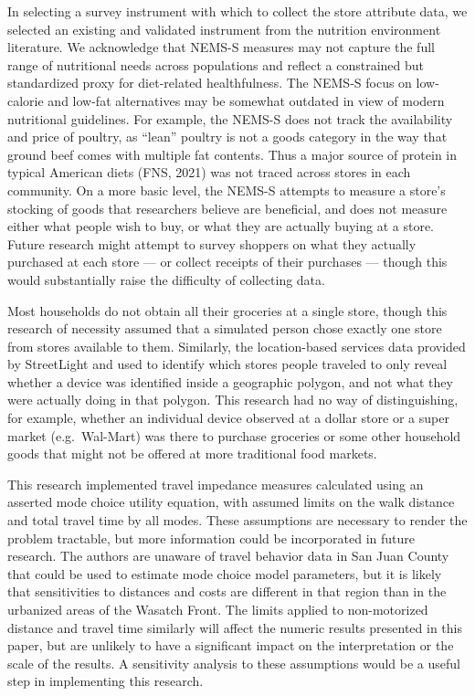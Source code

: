 \documentclass[
  letterpaper,
  number,
  review,
  3p]{elsarticle}
\begin{document}
In selecting a survey instrument with which to collect the store
attribute data, we selected an existing and validated instrument from
the nutrition environment literature. We acknowledge that NEMS-S
measures may not capture the full range of nutritional needs across
populations and reflect a constrained but standardized proxy for
diet-related healthfulness. The NEMS-S focus on low-calorie and low-fat
alternatives may be somewhat outdated in view of modern nutritional
guidelines. For example, the NEMS-S does not track the availability and
price of poultry, as ``lean'' poultry is not a goods category in the way
that ground beef comes with multiple fat contents. Thus a major source
of protein in typical American diets (FNS, 2021) was not traced across
stores in each community. On a more basic level, the NEMS-S attempts to
measure a store's stocking of goods that researchers believe are
beneficial, and does not measure either what people wish to buy, or what
they are actually buying at a store. Future research might attempt to
survey shoppers on what they actually purchased at each store --- or
collect receipts of their purchases --- though this would substantially
raise the difficulty of collecting data.

Most households do not obtain all their groceries at a single store,
though this research of necessity assumed that a simulated person chose
exactly one store from stores available to them. Similarly, the
location-based services data provided by StreetLight and used to
identify which stores people traveled to only reveal whether a device
was identified inside a geographic polygon, and not what they were
actually doing in that polygon. This research had no way of
distinguishing, for example, whether an individual device observed at a
dollar store or a super market (e.g.~Wal-Mart) was there to purchase
groceries or some other household goods that might not be offered at
more traditional food markets.

This research implemented travel impedance measures calculated using an
asserted mode choice utility equation, with assumed limits on the walk
distance and total travel time by all modes. These assumptions are
necessary to render the problem tractable, but more information could be
incorporated in future research. The authors are unaware of travel
behavior data in San Juan County that could be used to estimate mode
choice model parameters, but it is likely that sensitivities to
distances and costs are different in that region than in the urbanized
areas of the Wasatch Front. The limits applied to non-motorized distance
and travel time similarly will affect the numeric results presented in
this paper, but are unlikely to have a significant impact on the
interpretation or the scale of the results. A sensitivity analysis to
these assumptions would be a useful step in implementing this research.
\end{document}
